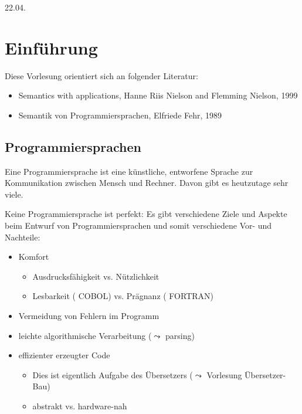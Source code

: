 \newpage
\hfill 22.04.

\section{Einführung}

Diese Vorlesung orientiert sich an folgender Literatur:
\begin{itemize}
    \item Semantics with applications, Hanne Riis Nielson and Flemming Nielson, 1999
    \item Semantik von Programmiersprachen, Elfriede Fehr, 1989
\end{itemize}



\subsection{Programmiersprachen}

Eine Programmiersprache ist eine künstliche, entworfene Sprache zur Kommunikation zwischen Mensch und Rechner. Davon gibt es heutzutage sehr viele.

Keine Programmiersprache ist perfekt: Es gibt verschiedene Ziele und Aspekte beim Entwurf von Programmiersprachen und somit verschiedene Vor- und Nachteile:
\begin{itemize}
    \item Komfort
    \begin{itemize}
        \item Ausdrucksfähigkeit vs. Nützlichkeit
        \item Lesbarkeit (\zb{} COBOL) vs. Prägnanz (\zb{} FORTRAN)
    \end{itemize}
    \item Vermeidung von Fehlern im Programm
    \item leichte algorithmische Verarbeitung ($\leadsto$ parsing)
    \item effizienter erzeugter Code
    \begin{itemize}
        \item Dies ist eigentlich Aufgabe des Übersetzers ($\leadsto$ Vorlesung Übersetzer-Bau)
        \item abstrakt vs. hardware-nah
    \end{itemize}
\end{itemize}

